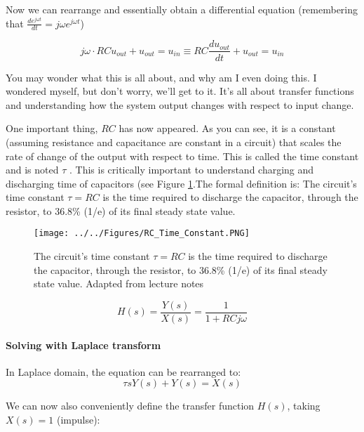 Now we can rearrange and essentially obtain a differential equation (remembering that $\frac{de^{j\omega t}}{dt} = j \omega e^{j\omega t}$)

\begin{equation}
    j \omega \cdot RC u_{out} + u_{out} = u_{in} \equiv RC\frac{du_{out}}{dt} + u_{out} = u_{in}
\end{equation}

You may wonder what this is all about, and why am I even doing this. I wondered myself, but don't worry, we'll get to it. It's all about transfer functions and understanding how the system output changes with respect to input change.

One important thing, $RC$ has now appeared. As you can see, it is a constant (assuming resistance and capacitance are constant in a circuit) that scales the rate of change of the output with respect to time. This is called the time constant and is noted $\tau$ . This is critically important to understand charging and discharging time of capacitors (see Figure \ref{fig:Time_Constant}.The formal definition is: The circuit's time constant $\tau = RC$ is the time required to discharge the capacitor, through the resistor, to 36.8\% (1/e) of its final steady state value.

\begin{figure}[H]
    \centering
    \texttt{[image: ../../Figures/RC\_Time\_Constant.PNG]}
    \caption{The circuit's time constant $\tau = RC$ is the time required to discharge the capacitor, through the resistor, to 36.8\% (1/e) of its final steady state value. Adapted from lecture notes}
    \label{fig:Time_Constant}
\end{figure}



\begin{equation}
    H(s) = \frac{Y(s)}{X(s)} = \frac{1}{1 + RCj \omega }
\end{equation}

\paragraph{Solving with Laplace transform}

In Laplace domain, the equation can be rearranged to: 
\begin{equation}
    \tau s Y(s) + Y(s) = X(s)
\end{equation}

We can now also conveniently define the transfer function $H(s)$, taking $X(s) = 1$ (impulse): 

